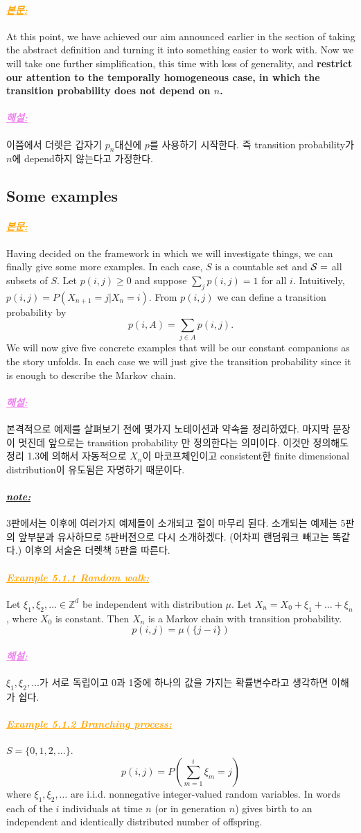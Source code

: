 \documentclass[12pt,oneside,english,a4paper]{article}
\def\note{\paragraph{\LARGE\textit{\underline{note:}}}\LARGE}
\newcommand{\paraviolet}[1]{\paragraph{\LARGE\textcolor{violet}{\it\underline{\textbf{#1:}}}}\LARGE}
\newcommand{\paraorange}[1]{\paragraph{\LARGE\textcolor{orange}{\it\underline{\textbf{#1:}}}}\LARGE}
\begin{document}
\paraorange{본문} At this point, we have achieved our aim announced earlier in the section of taking the abstract definition and turning it into something easier to work with. Now we will take one further simplification, this time with loss of generality, and \textbf{restrict our attention to the temporally homogeneous case, in which the transition probability does not depend on $n$.}

\paraviolet{해설} 이쯤에서 더렛은 갑자기 $p_n$대신에 $p$를 사용하기 시작한다. 즉 transition probability가 $n$에 depend하지 않는다고 가정한다.


\subsection{Some examples} 
\paraorange{본문} Having decided on the framework in which we will investigate things, we can finally give some more examples. In each case, $S$ is a countable set and ${\cal S} =$ all subsets of $S$. Let $p(i,j)\geq 0$ and suppose $\sum_jp(i,j)=1$ for all $i$. Intuitively, $p(i,j) = P(X_{n+1} = j |X_n = i)$. From $p(i,j)$ we can define a transition probability by
\[
p(i,A)=\sum_{j \in A}p(i,j).
\]
We will now give five concrete examples that will be our constant companions
as the story unfolds. In each case we will just give the transition probability since it is enough to describe the Markov chain.

\paraviolet{해설} 본격적으로 예제를 살펴보기 전에 몇가지 노테이션과 약속을 정리하였다. 마지막 문장이 멋진데 앞으로는 transition probability 만 정의한다는 의미이다. 이것만 정의해도 정리 1.3에 의해서 자동적으로 $X_n$이 마코프체인이고 consistent한 finite dimensional distribution이 유도됨은 자명하기 때문이다. 

\note 3판에서는 이후에 여러가지 예제들이 소개되고 절이 마무리 된다. 소개되는 예제는 5판의 앞부분과 유사하므로 5판버전으로 다시 소개하겠다. (어차피 랜덤워크 빼고는 똑같다.) 이후의 서술은 더렛책 5판을 따른다.

\paraorange{Example 5.1.1 Random walk} 
Let $\xi_1,\xi_2,\dots \in \mathbb{Z}^d$ be independent with distribution $\mu$. Let $X_n = X_0 + \xi_1 + \dots + \xi_n$, where $X_0$ is constant. Then $X_n$ is a Markov chain with transition probability. 
\[
p(i,j)=\mu(\{j-i\})
\]

\paraviolet{해설} $\xi_1,\xi_2,\dots$가 서로 독립이고 0과 1중에 하나의 값을 가지는 확률변수라고 생각하면 이해가 쉽다. 

\paraorange{Example 5.1.2 Branching process} $S=\{0,1,2,\dots\}$. 
\[
p(i,j)=P\left(\sum_{m=1}^{i}\xi_m=j\right)
\]
where $\xi_1,\xi_2,\dots$ are i.i.d. nonnegative integer-valued random variables. In words each of the $i$ individuals at time $n$ (or in generation $n$) gives birth to an independent and identically distributed number of offspring.
\end{document}
